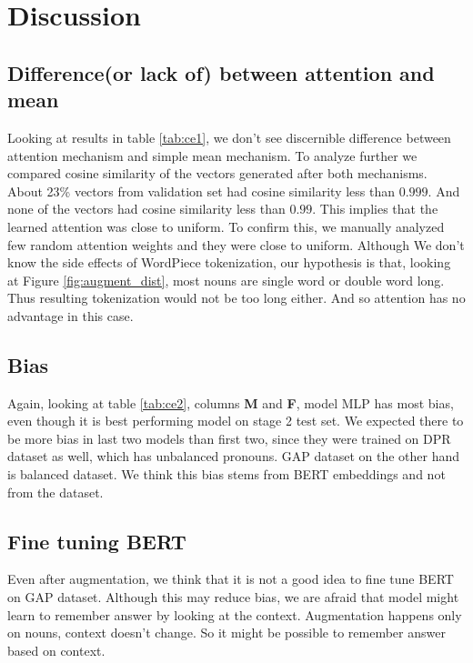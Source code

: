 \documentclass[11pt,a4paper]{article}
\begin{document}
\section{Discussion}
\label{sec:discussion}

\subsection{Difference(or lack of) between attention and mean}
Looking at results in table \ref{tab:ce1}, we don't see discernible difference between attention mechanism and simple mean mechanism. To analyze further we compared cosine similarity of the vectors generated after both mechanisms. About 23\% vectors from validation set had cosine similarity less than $0.999$. And none of the vectors had cosine similarity less than $0.99$. This implies that the learned attention was close to uniform. To confirm this,  we manually analyzed few random attention weights and they were close to uniform. Although We don't know the side effects of WordPiece tokenization, our hypothesis is that, looking at Figure \ref{fig:augment_dist}, most nouns are single word or double word long. Thus resulting tokenization would not be too long either. And so attention has no advantage in this case.

\subsection{Bias}
\label{sec:bias}
Again, looking at table \ref{tab:ce2}, columns \textbf{M} and \textbf{F}, model MLP has most bias, even though it is best performing model on stage 2 test set. We expected there to be more bias in last two models than first two, since they were trained on DPR dataset as well, which has unbalanced pronouns. GAP dataset on the other hand is balanced dataset. We think this bias stems from BERT embeddings and not from the dataset.

\subsection{Fine tuning BERT}
Even after augmentation, we think that it is not a good idea to fine tune BERT on GAP dataset. Although this may reduce bias, we are afraid that model might learn to remember answer by looking at the context. Augmentation happens only on nouns, context doesn't change. So it might be possible to remember answer based on context. %
\end{document}
